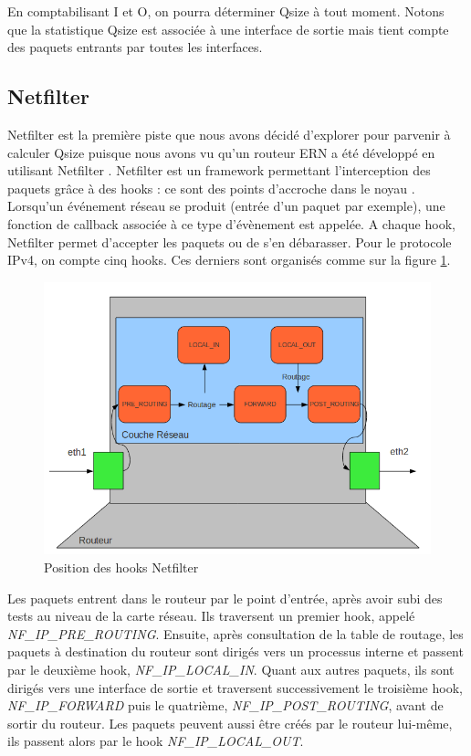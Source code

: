 \documentclass[a4paper]{article}
\begin{document}
En comptabilisant I et O,
on pourra déterminer Qsize à tout moment.
Notons que la statistique Qsize est associée à une interface de sortie mais tient compte des paquets entrants par toutes les interfaces.

\subsection{Netfilter}
Netfilter est la première piste que nous avons décidé d'explorer pour 
parvenir à calculer Qsize puisque nous avons vu qu'un routeur ERN a été développé en utilisant Netfilter \cite{stanford}.
Netfilter est un framework permettant l'interception des paquets
grâce à des hooks : ce sont des points d'accroche dans le noyau \cite{netfilter1}.
Lorsqu'un événement réseau se produit (entrée d'un paquet par exemple),
une fonction de callback associée à ce type d'évènement est appelée.
A chaque hook, Netfilter permet d'accepter les paquets ou de s'en
débarasser. Pour le protocole IPv4, on compte cinq hooks. Ces derniers
sont organisés comme sur la figure \ref{hooks}.

\begin{figure}[!ht]
	\centering
	\includegraphics[scale=.5]{hooks.png}
	\caption{\label{hooks} Position des hooks Netfilter}
\end{figure}

Les paquets entrent dans le routeur par le point d'entrée, après avoir 
subi des tests au niveau de la carte réseau. Ils traversent un premier 
hook, appelé \textit{NF\_IP\_PRE\_ROUTING}. Ensuite, après consultation de la table 
de routage, les paquets à destination du routeur sont dirigés vers un 
processus interne et passent par le deuxième hook, \textit{NF\_IP\_LOCAL\_IN}. 
Quant aux autres paquets, ils sont dirigés vers une interface de sortie 
et traversent successivement le troisième hook, \textit{NF\_IP\_FORWARD} puis le 
quatrième, \textit{NF\_IP\_POST\_ROUTING}, avant de sortir du routeur. Les paquets 
peuvent aussi être créés par le routeur lui-même, ils passent alors 
par le hook \textit{NF\_IP\_LOCAL\_OUT}.
\end{document}
